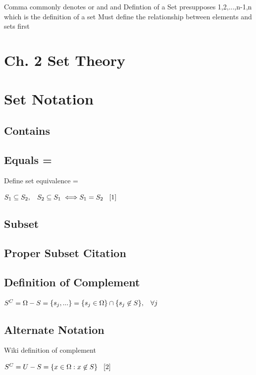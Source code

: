 \documentclass[11pt]{article}
\begin{document}
Comma commonly denotes or and and
Defintion of a Set presupposes 1,2,...,n-1,n which is the definition of a set
Must define the relationship between elements and sets first


\section*{Ch. 2 Set Theory}


\section{Set Notation}


\subsection{Contains}
\subsection{Equals = }
Define set equivalence  =
\begin{center}
$
S_1 \subseteq S_2, \hspace{3mm} S_2 \subseteq S_1 \hspace{1mm} \Longleftrightarrow S_1 = S_2 \hspace{3mm} [1]
$
\end{center}


\subsection{Subset}



\subsection{Proper Subset Citation}



\subsection{Definition of Complement}
\begin{center}
$
S^C = \Omega - S = \{s_j,...\} = \{ s_j \in \Omega\} \cap \{s_j \not \in S\}, \hspace{3mm} \forall j
$
\end{center}
\subsection{Alternate Notation}
Wiki definition of complement
\begin{center}
$
S^C = U - S = \{x \in \Omega : x \not \in S\} \hspace{3mm} [2]
$
\end{center}
\end{document}
